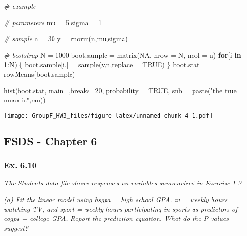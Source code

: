 \documentclass[
]{article}
\newenvironment{Shaded}{\begin{snugshade}}{\end{snugshade}}
\newcommand{\AttributeTok}[1]{\textcolor[rgb]{0.77,0.63,0.00}{#1}}
\newcommand{\CommentTok}[1]{\textcolor[rgb]{0.56,0.35,0.01}{\textit{#1}}}
\newcommand{\ConstantTok}[1]{\textcolor[rgb]{0.00,0.00,0.00}{#1}}
\newcommand{\ControlFlowTok}[1]{\textcolor[rgb]{0.13,0.29,0.53}{\textbf{#1}}}
\newcommand{\DecValTok}[1]{\textcolor[rgb]{0.00,0.00,0.81}{#1}}
\newcommand{\FunctionTok}[1]{\textcolor[rgb]{0.00,0.00,0.00}{#1}}
\newcommand{\NormalTok}[1]{#1}
\newcommand{\OtherTok}[1]{\textcolor[rgb]{0.56,0.35,0.01}{#1}}
\newcommand{\SpecialCharTok}[1]{\textcolor[rgb]{0.00,0.00,0.00}{#1}}
\newcommand{\StringTok}[1]{\textcolor[rgb]{0.31,0.60,0.02}{#1}}
\begin{document}
\begin{Shaded}
\begin{Highlighting}[]
\CommentTok{\# example}

\CommentTok{\# parameters}
\NormalTok{mu }\OtherTok{=} \DecValTok{5}
\NormalTok{sigma }\OtherTok{=} \DecValTok{1}

\CommentTok{\# sample}
\NormalTok{n }\OtherTok{=} \DecValTok{30}
\NormalTok{y }\OtherTok{=} \FunctionTok{rnorm}\NormalTok{(n,mu,sigma)}

\CommentTok{\# bootstrap}
\NormalTok{N }\OtherTok{=} \DecValTok{1000}
\NormalTok{boot.sample }\OtherTok{=} \FunctionTok{matrix}\NormalTok{(}\ConstantTok{NA}\NormalTok{, }\AttributeTok{nrow =}\NormalTok{ N, }\AttributeTok{ncol =}\NormalTok{ n)}
\ControlFlowTok{for}\NormalTok{(i }\ControlFlowTok{in} \DecValTok{1}\SpecialCharTok{:}\NormalTok{N)}
\NormalTok{\{}
\NormalTok{  boot.sample[i,] }\OtherTok{=} \FunctionTok{sample}\NormalTok{(y,n,}\AttributeTok{replace =} \ConstantTok{TRUE}\NormalTok{)}
\NormalTok{\}}
\NormalTok{boot.stat }\OtherTok{=} \FunctionTok{rowMeans}\NormalTok{(boot.sample)}

\FunctionTok{hist}\NormalTok{(boot.stat, }\AttributeTok{main=}\StringTok{\textquotesingle{}\textquotesingle{}}\NormalTok{,}\AttributeTok{breaks=}\DecValTok{20}\NormalTok{, }\AttributeTok{probability =} \ConstantTok{TRUE}\NormalTok{, }\AttributeTok{sub =} \FunctionTok{paste}\NormalTok{(}\StringTok{"the true mean is"}\NormalTok{,mu))}
\end{Highlighting}
\end{Shaded}

\texttt{[image: GroupF\_HW3\_files/figure-latex/unnamed-chunk-4-1.pdf]}

\hypertarget{fsds---chapter-6}{%
\subsection{FSDS - Chapter 6}\label{fsds---chapter-6}}

\hypertarget{ex.-6.10}{%
\subsubsection{Ex. 6.10}\label{ex.-6.10}}

\emph{The Students data file shows responses on variables summarized in
Exercise 1.2.}

\emph{(a) Fit the linear model using hsgpa = high school GPA, tv =
weekly hours watching TV, and sport = weekly hours participating in
sports as predictors of cogpa = college GPA. Report the prediction
equation. What do the P-values suggest?}
\end{document}
